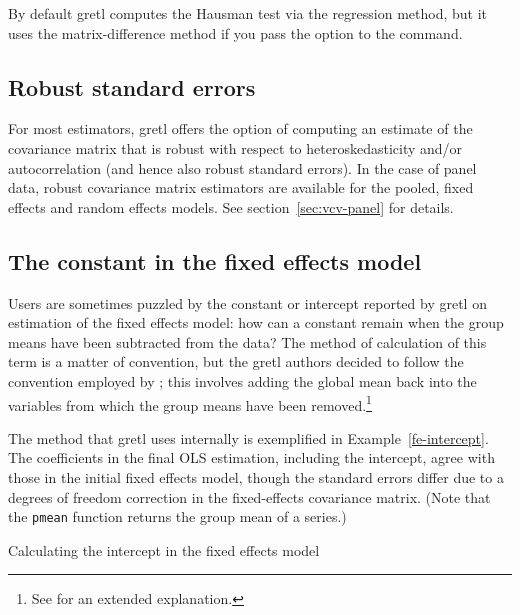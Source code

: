 By default gretl computes the Hausman test via the regression
method, but it uses the matrix-difference method if you pass the
option  to the  command.

\subsection{Robust standard errors}
\label{panel-robust}

For most estimators, gretl offers the option of computing an estimate
of the covariance matrix that is robust with respect to
heteroskedasticity and/or autocorrelation (and hence also robust
standard errors).  In the case of panel data, robust covariance matrix
estimators are available for the pooled, fixed effects and random
effects models.  See section~\ref{sec:vcv-panel} for details.

\subsection{The constant in the fixed effects model}

Users are sometimes puzzled by the constant or intercept reported by
gretl on estimation of the fixed effects model: how can a constant
remain when the group means have been subtracted from the data? The
method of calculation of this term is a matter of convention, but the
gretl authors decided to follow the convention employed by
; this involves adding the global mean back into the
variables from which the group means have been removed.\footnote{See
  \cite{gould13} for an extended explanation.}

The method that gretl uses internally is exemplified in
Example~\ref{fe-intercept}. The coefficients in the final OLS
estimation, including the intercept, agree with those in the initial
fixed effects model, though the standard errors differ due to a
degrees of freedom correction in the fixed-effects covariance matrix.
(Note that the \texttt{pmean} function returns the group mean of a
series.)

\begin{script}[htbp]
  \caption{Calculating the intercept in the fixed effects model}
  \label{fe-intercept}
\end{script}

